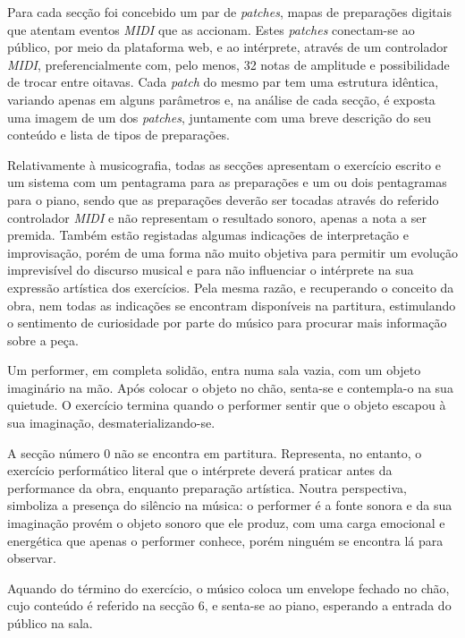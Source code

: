 \documentclass[../main.tex]{subfiles}
\begin{document}
Para cada secção foi concebido um par de \textsl{patches}, mapas de preparações digitais que atentam eventos \textsl{MIDI} que as accionam. Estes \textsl{patches} conectam-se ao público, por meio da plataforma web, e ao intérprete, através de um controlador \textsl{MIDI}, preferencialmente com, pelo menos, 32 notas de amplitude e possibilidade de trocar entre oitavas. Cada \textsl{patch} do mesmo par tem uma estrutura idêntica, variando apenas em alguns parâmetros e, na análise de cada secção, é exposta uma imagem de um dos \textsl{patches}, juntamente com uma breve descrição do seu conteúdo e lista de tipos de preparações.

Relativamente à musicografia, todas as secções apresentam o exercício escrito e um sistema com um pentagrama para as preparações e um ou dois pentagramas para o piano, sendo que as preparações deverão ser tocadas através do referido controlador \textsl{MIDI} e não representam o resultado sonoro, apenas a nota a ser premida. Também estão registadas algumas indicações de interpretação e improvisação, porém de uma forma não muito objetiva para permitir um evolução imprevisível do discurso musical e para não influenciar o intérprete na sua expressão artística dos exercícios. Pela mesma razão, e recuperando o conceito da obra, nem todas as indicações se encontram disponíveis na partitura, estimulando o sentimento de curiosidade por parte do músico para procurar mais informação sobre a peça.

\begin{performex}
    Um performer, em completa solidão, entra numa sala vazia, com um objeto imaginário na mão. Após colocar o objeto no chão, senta-se e contempla-o na sua quietude. O exercício termina quando o performer sentir que o objeto escapou à sua imaginação, desmaterializando-se.
\end{performex}

A secção número 0 não se encontra em partitura. Representa, no entanto, o exercício performático literal que o intérprete deverá praticar antes da performance da obra, enquanto preparação artística. Noutra perspectiva, simboliza a presença do silêncio na música: o performer é a fonte sonora e da sua imaginação provém o objeto sonoro que ele produz, com uma carga emocional e energética que apenas o performer conhece, porém ninguém se encontra lá para observar.

Aquando do término do exercício, o músico coloca um envelope fechado no chão, cujo conteúdo é referido na secção 6, e senta-se ao piano, esperando a entrada do público na sala.
\end{document}
